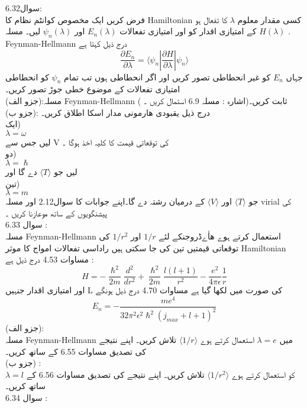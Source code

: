 
سوال6.32:
\\
فرض کریں ایک مخصوص کوانٹم نظام کا  
Hamiltonian 
کسی مقدار معلوم
\(\lambda\)
 کا تفعال ہو .
\(H(\lambda)\)
کے امتیازی اقدار کو اور امتیازی تفعالات
\(E_{n}(\lambda)\)
اور
\(\psi_{n}(\lambda)\)
لیں۔ 
مسلہ Feynman-Hellmann درج ذیل کہتا ہے
\[\frac{\partial E_{n}}{\partial \lambda}=\big\langle{\psi_{n}|\frac{\partial{H}}{\partial{\lambda}}|\psi_{n}}\big\rangle\]
جہاں 
\(E_{n}\)
کو غیر انحطاطی تصور کریں اور اگر انحطاطی ہوں تب تمام 
\(\psi_{n}\)
کو انحطاطی امتیازی تفعالات کے موضوع خطی جوڑ تصور کریں۔\\
(جزو الف):مسلہ Feynman-Hellmann ثابت کریں۔(اشارہ : مسلہ 6.9 استمال کریں ۔ )\\
(جزو ب): درج ذیل یقبودی هارمونی مدار اسکا اطلاق کریں۔\\
ایک)\\
\(\lambda=\omega\)\\
لیں جس سے
V
کی توقعاتی قیمت کا کلیہ اخذ ہوگا ۔\\
دو)\\
\(\lambda=\hslash\)\\
لیں جو
\(\langle T \rangle\)
دے گا اور\\
تین)\\
\(\lambda=m\)\\
جو 
\(\langle T \rangle\)
اور 
\(\langle V \rangle\)
کے درمیان رشتہ دے گا۔اپنے جوابات کا سوال2.12 اور مسلہ virial کی پیشنگویوں  کے ساتھ موعازنا کریں ۔\\
سوال 6.33 : 
\\
مسلہ Feynman-Hellmann استعمال کرتے ہوے ھاٰےڈروجنکے لئے 
\(1/r\)
اور 
\(1/r^{2}\)
کی توقعاتی قیمتیں تین کی جا سکتی ہیں راداسی تفعالات امواج کا موثر 
Hamiltonian 
مساوات 4.53 درج ذیل ہے :
\[H=-\frac{\hslash^{2}}{2m}\frac{d^{2}}{dr^{2}}+\frac{\hslash^{2}}{2m}\frac{l(l+1)}{r^{2}}-\frac{e^{2}}{4\pi\epsilon}\frac{1}{r}\]
اور امتیازی اقدار جنہیں 
L
کی صورت میں لکھا گیا ہے مساوات 4.70 درج ذیل ہونگے 
\[E_n=-\frac{me^{4}}{32\pi^{2}\epsilon^{2}\hslash^{2}(j_{max}+l+1)^{2}}\]
(جزو الف):\\
 مسلہ Feynman-Hellmann میں 
\(\lambda=e\)
استعمال کرتے ہوے
\(\langle1/r\rangle\)
تلاش کریں۔ اپنے نتیجے کی تصدیق مساوات 6.55 کے ساتھ کریں۔\\
(جزو ب) :\\
\(\lambda=l\)
کو استعمال کرتے ہوے
\(\langle1/r^{2}\rangle\)
تلاش کریں۔ اپنے نتیجے کی تصدیق مساوات 6.56 کے ساتھ کریں۔\\
سوال 6.34 :\\
